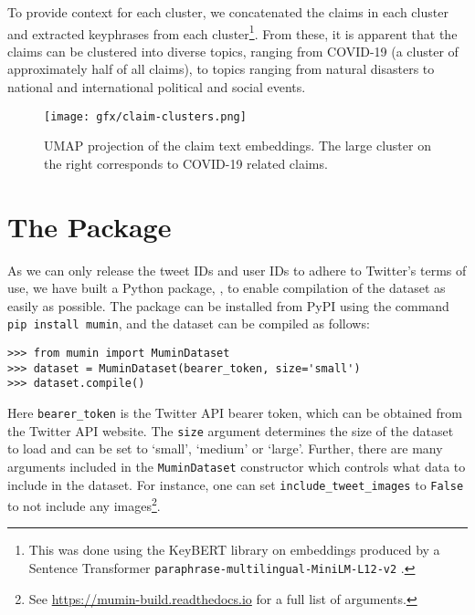 \documentclass[sigconf,natbib=true,anonymous=false,nonacm]{acmart}
\begin{document}
To provide context for each cluster, we concatenated the claims in each cluster
and extracted keyphrases from each cluster\footnote{This was done using the
KeyBERT library \citep{grootendorst2020keybert} on embeddings produced by a
Sentence Transformer \texttt{paraphrase-multilingual-MiniLM-L12-v2}
\cite{reimers2019sentencebert}.}. From these, it is apparent that the claims
can be clustered into diverse topics, ranging from COVID-19 (a cluster of
approximately half of all claims), to topics ranging from natural disasters to
national and international political and social events.

\begin{figure}[h!]
    \centering
     \texttt{[image: gfx/claim-clusters.png]}
    \caption{UMAP projection of the claim text embeddings. The large cluster on
             the right corresponds to COVID-19 related claims.}
    \label{fig:clusters}
\end{figure}








\section{The \pkgname Package}
\label{sec:muminpackage}

As we can only release the tweet IDs and user IDs to adhere to Twitter's terms
of use, we have built a Python package, \pkgname, to enable compilation of the
dataset as easily as possible. The package can be installed from PyPI using the
command \texttt{pip install mumin}, and the dataset can be compiled as follows:

\begin{verbatim}
>>> from mumin import MuminDataset
>>> dataset = MuminDataset(bearer_token, size='small')
>>> dataset.compile()
\end{verbatim}

Here \texttt{bearer\_token} is the Twitter API bearer token, which can be
obtained from the Twitter API website. The \texttt{size} argument determines
the size of the dataset to load and can be set to `small', `medium' or `large'.
Further, there are many arguments included in the \texttt{MuminDataset}
constructor which controls what data to include in the dataset. For instance,
one can set \texttt{include\_tweet\_images} to \texttt{False} to not include
any images\footnote{See \url{https://mumin-build.readthedocs.io} for a full
list of arguments.}.
\end{document}

